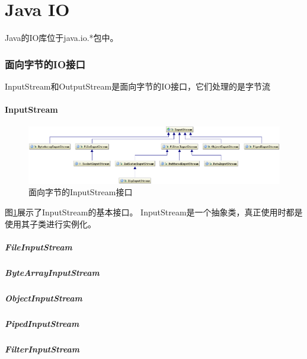 \documentclass[a4paper,11pt]{article}
\begin{document}
\part[Java IO]{Java IO}
Java的IO库位于java.io.*包中。

\section[面向字节的IO接口]{面向字节的IO接口}
InputStream和OutputStream是面向字节的IO接口，它们处理的是字节流

\subsection[InputStream]{InputStream}
\begin{figure}
  \centering
  \includegraphics[width=.9\textwidth]{picturedir/inputstream.png}
  \caption{面向字节的InputStream接口}
  \label{fig:inputstream}
\end{figure}

图\ref{fig:inputstream}展示了InputStream的基本接口。
InputStream是一个抽象类，真正使用时都是使用其子类进行实例化。

\subsubsection[FileInputStream]{FileInputStream}
\subsubsection[ByteArrayInputStream]{ByteArrayInputStream}
\subsubsection[ObjectInputStream]{ObjectInputStream}
\subsubsection[PipedInputStream]{PipedInputStream}
\subsubsection[FilterInputStream]{FilterInputStream}
\end{document}
